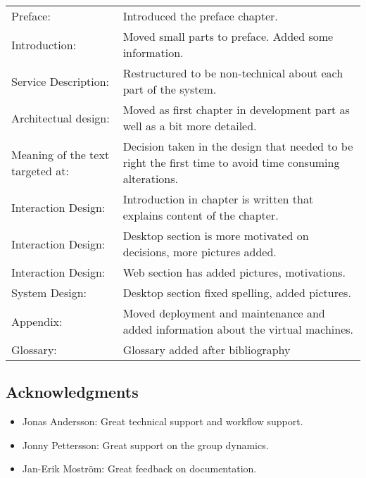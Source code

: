 \begin{tabularx}{\textwidth}{lX}
	Preface: & Introduced the preface chapter. \\
	Introduction: & Moved small parts to preface. Added some information. \\
	Service Description: & Restructured to be non-technical about each part of the system. \\
	Architectual design: & Moved as first chapter in development part as well as a bit more detailed. \\
	Meaning of the text targeted at:  & Decision taken in the design that needed to be right the first time to avoid time consuming alterations. \\
	Interaction Design: & Introduction in chapter is written that explains content of the chapter. \\
	Interaction Design: & Desktop section is more motivated on decisions, more pictures added. \\
	Interaction Design: & Web section has added pictures, motivations. \\
	System Design: & Desktop section fixed spelling, added pictures. \\
	Appendix: & Moved deployment and maintenance and added information about the virtual machines.\\
	Glossary:  & Glossary added after bibliography \\
\end{tabularx}

\subsection*{Acknowledgments}
\begin{itemize}
	\item Jonas Andersson: Great technical support and workflow support.
	\item Jonny Pettersson: Great support on the group dynamics.
	\item Jan-Erik Moström: Great feedback on documentation.
\end{itemize}


